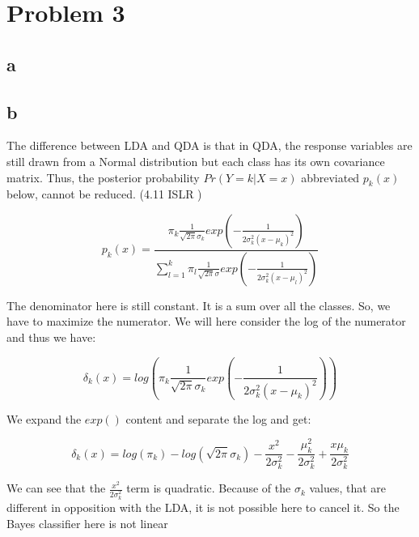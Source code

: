 \section*{Problem 3}
\subsection*{a}





\subsection*{b}
The difference between LDA and QDA is that in QDA, the response variables are still drawn from a Normal distribution but each class has its own covariance matrix. Thus, the posterior probability $ Pr(Y = k | X = x) $ abbreviated $ p_k(x) $ below, cannot be reduced. (4.11 ISLR )

\[ p_k (x) = \frac{\pi_k \frac{1}{\sqrt{2\pi}\sigma_k}exp({-\frac{1}{2\sigma^2_k (x - \mu_k)^2}})}{\sum_{l=1}^{k}\pi_l \frac{1}{\sqrt{2\pi}\sigma}exp({-\frac{1}{2\sigma^2_k (x - \mu_l)^2}})} \]

The denominator here is still constant. It is a sum over all the classes. So, we have to maximize the numerator. We will here consider the log of the numerator and thus we have:

\[ \delta_k (x) = log\left({\pi_k \frac{1}{\sqrt{2\pi}\sigma_k}exp\left({-\frac{1}{2\sigma^2_k (x - \mu_k)^2}}\right)}\right) \]

We expand the $exp()$ content and separate the log and get:

\[ \delta_k (x) = log(\pi_k) - log(\sqrt{2\pi}\sigma_k) - \frac{x^2}{2\sigma^2_k} - \frac{\mu^2_k}{2\sigma^2_k} + \frac{x\mu_k}{2\sigma^2_k} \]

We can see that the $\frac{x^2}{2\sigma^2_k}$ term is quadratic. Because of the $\sigma_k$ values, that are different in opposition with the LDA, it is not possible here to cancel it. So the Bayes classifier here is not linear



